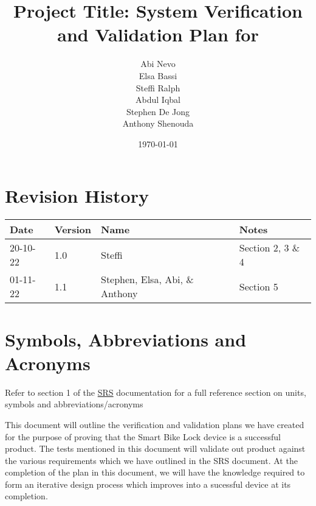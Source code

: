 \documentclass[12pt, titlepage]{article}
\begin{document}
\title{Project Title: System Verification and Validation Plan for } 
\author{Abi Nevo\\Elsa Bassi\\Steffi Ralph\\Abdul Iqbal\\Stephen De Jong\\Anthony Shenouda}
\date{\today}
	
\maketitle


\section{Revision History}

\begin{tabularx}{\textwidth}{p{2cm}p{2cm}p{2cm}X}
\toprule {\bf Date} & {\bf Version} & {\bf Name} & {\bf Notes}\\
\midrule
20-10-22 & 1.0 & Steffi & Section 2, 3 \& 4\\
01-11-22 & 1.1 & Stephen, Elsa, Abi, \& Anthony & Section 5\\
\bottomrule
\end{tabularx}

\newpage

\tableofcontents

\listoftables
{}

\listoffigures
{}

\newpage

\section{Symbols, Abbreviations and Acronyms}

Refer to section 1 of the \href{https://github.com/NevoAbigail/Capstone/blob/main/docs/SRS/SRS.pdf}{SRS} documentation for a full reference section on units, symbols and abbreviations/acronyms


\newpage


This document will outline the verification and validation plans we have created for the purpose of proving that the Smart Bike Lock device is a successful product. The tests mentioned in this document will validate out product against the various requirements which we have outlined in the SRS document. At the completion of the plan in this document, we will have the knowledge required to form an iterative design process which improves into a sucessful device at its completion. 
\end{document}
